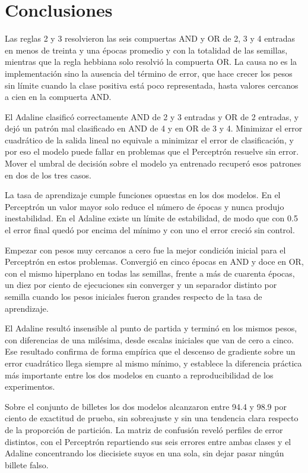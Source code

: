 \documentclass[11pt,letterpaper]{article}
\begin{document}
\section{Conclusiones}

Las reglas 2 y 3 resolvieron las seis compuertas AND y OR de 2, 3 y 4 entradas en menos de treinta y una épocas promedio y con la totalidad de las semillas, mientras que la regla hebbiana solo resolvió la compuerta OR. La causa no es la implementación sino la ausencia del término de error, que hace crecer los pesos sin límite cuando la clase positiva está poco representada, hasta valores cercanos a cien en la compuerta AND.

El Adaline clasificó correctamente AND de 2 y 3 entradas y OR de 2 entradas, y dejó un patrón mal clasificado en AND de 4 y en OR de 3 y 4. Minimizar el error cuadrático de la salida lineal no equivale a minimizar el error de clasificación, y por eso el modelo puede fallar en problemas que el Perceptrón resuelve sin error. Mover el umbral de decisión sobre el modelo ya entrenado recuperó esos patrones en dos de los tres casos.

La tasa de aprendizaje cumple funciones opuestas en los dos modelos. En el Perceptrón un valor mayor solo reduce el número de épocas y nunca produjo inestabilidad. En el Adaline existe un límite de estabilidad, de modo que con 0.5 el error final quedó por encima del mínimo y con uno el error creció sin control.

Empezar con pesos muy cercanos a cero fue la mejor condición inicial para el Perceptrón en estos problemas. Convergió en cinco épocas en AND y doce en OR, con el mismo hiperplano en todas las semillas, frente a más de cuarenta épocas, un diez por ciento de ejecuciones sin converger y un separador distinto por semilla cuando los pesos iniciales fueron grandes respecto de la tasa de aprendizaje.

El Adaline resultó insensible al punto de partida y terminó en los mismos pesos, con diferencias de una milésima, desde escalas iniciales que van de cero a cinco. Ese resultado confirma de forma empírica que el descenso de gradiente sobre un error cuadrático llega siempre al mismo mínimo, y establece la diferencia práctica más importante entre los dos modelos en cuanto a reproducibilidad de los experimentos.

Sobre el conjunto de billetes los dos modelos alcanzaron entre 94.4 y 98.9 por ciento de exactitud de prueba, sin sobreajuste y sin una tendencia clara respecto de la proporción de partición. La matriz de confusión reveló perfiles de error distintos, con el Perceptrón repartiendo sus seis errores entre ambas clases y el Adaline concentrando los diecisiete suyos en una sola, sin dejar pasar ningún billete falso.
\end{document}
